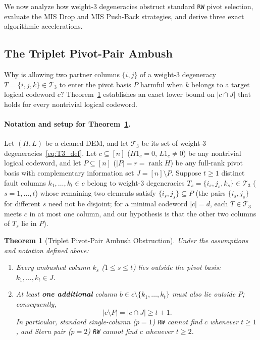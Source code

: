 \documentclass[12pt]{article}
\newtheorem{theorem}{Theorem}
\theoremstyle{definition}
\DeclareMathOperator{\rank}{rank}
\newcommand{\Tc}{\mathcal{T}_3}
\newcommand{\ttt}[1]{\texttt{#1}}
\begin{document}
We now analyze how weight-3 degeneracies obstruct standard \ttt{RW} pivot selection, evaluate the MIS Drop and MIS
Push-Back strategies, and derive three exact algorithmic accelerations.

\subsection{The Triplet Pivot-Pair Ambush}\label{subsec:ambush}

Why is allowing two partner columns $\{i, j\}$ of a weight-3 degeneracy $T = \{i, j, k\} \in \Tc$ to enter the
pivot basis $P$ harmful when $k$ belongs to a target logical codeword $c$? Theorem~\ref{thm:ambush} establishes an
exact lower bound on $|c \cap J|$ that holds for every nontrivial logical codeword.

\paragraph{Notation and setup for Theorem~\ref{thm:ambush}.}
Let $(H, L)$ be a cleaned DEM, and let $\Tc$ be its set of weight-3 degeneracies~\eqref{eq:T3_def}. Let $c
\subseteq [n]$ ($H 1_c = 0$, $L 1_c \neq 0$) be any nontrivial logical codeword, and let $P \subseteq [n]$ ($|P| =
r = \rank H$) be any full-rank pivot basis with complementary information set $J = [n] \setminus P$. Suppose $t \ge
1$ distinct fault columns $k_1, \dots, k_t \in c$ belong to weight-3 degeneracies $T_s = \{i_s, j_s, k_s\} \in \Tc$
($s = 1, \dots, t$) whose remaining two elements satisfy $\{i_s, j_s\} \subseteq P$ (the pairs $\{i_s, j_s\}$ for
different $s$ need not be disjoint; for a minimal codeword $|c| = d$, each $T \in \Tc$ meets $c$ in at most one
column, and our hypothesis is that the other two columns of $T_s$ lie in $P$).

\begin{theorem}[Triplet Pivot-Pair Ambush Obstruction]\label{thm:ambush}
Under the assumptions and notation defined above:
\begin{enumerate}[label=(\alph*)]
  \item Every ambushed column $k_s$ ($1 \le s \le t$) lies outside the pivot basis: $k_1, \dots, k_t \in J$.
  \item At least \textbf{one additional} column $b \in c \setminus \{k_1, \dots, k_t\}$ must also lie outside $P$;
    consequently,
    \begin{equation}\label{eq:ambush_bound}
      |c \setminus P| = |c \cap J| \ge t + 1.
    \end{equation}
    In particular, standard single-column ($p = 1$) \ttt{RW} cannot find $c$ whenever $t \ge 1$, and Stern pair
    ($p = 2$) \ttt{RW} cannot find $c$ whenever $t \ge 2$.
\end{enumerate}
\end{theorem}
\end{document}
